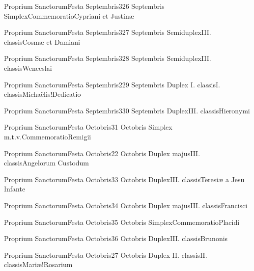 \documentclass[psalterium-feriale.tex]{subfiles}
\begin{document}
	{Proprium Sanctorum}{Festa Septembris}{3}{26 Septembris}
	{Simplex}{Commemoratio}{Cypriani et Justinæ}
	{}
	{}
\PMEXaRubric

	{Proprium Sanctorum}{Festa Septembris}{3}{27 Septembris}
	{Semiduplex}{III. classis}{Cosmæ et Damiani}
	{}
	{}
\PMEXaRubric

	{Proprium Sanctorum}{Festa Septembris}{3}{28 Septembris}
	{Semiduplex}{III. classis}{Wenceslai}
	{}
	{}
\UMEXaRubric

	{Proprium Sanctorum}{Festa Septembris}{2}{29 Septembris}
	{Duplex I. classis}{I. classis}{Michaëlis!Dedicatio}
	{}
	{}
\psalmodiapropria

	{Proprium Sanctorum}{Festa Septembris}{3}{30 Septembris}
	{Duplex}{III. classis}{Hieronymi}
	{}
	{}
\COPOcRubric

	{Proprium Sanctorum}{Festa Octobris}{3}{1 Octobris}
	{Simplex m.t.v.}{Commemoratio}{Remigii}
	{}
	{}
\COPOaRubric

	{Proprium Sanctorum}{Festa Octobris}{2}{2 Octobris}
	{Duplex majus}{III. classis}{Angelorum Custodum}
	{}
	{}
\psalmodiapropria

	{Proprium Sanctorum}{Festa Octobris}{3}{3 Octobris}
	{Duplex}{III. classis}{Teresiæ a Jesu Infante}
	{}
	{}
\MUVNcRubric

	{Proprium Sanctorum}{Festa Octobris}{3}{4 Octobris}
	{Duplex majus}{III. classis}{Francisci}
	{}
	{}
\COPOcRubric

	{Proprium Sanctorum}{Festa Octobris}{3}{5 Octobris}
	{Simplex}{Commemoratio}{Placidi}
	{}
	{}
\PMEXaRubric

	{Proprium Sanctorum}{Festa Octobris}{3}{6 Octobris}
	{Duplex}{III. classis}{Brunonis}
	{}
	{}
\COPOcRubric

	{Proprium Sanctorum}{Festa Octobris}{2}{7 Octobris}
	{Duplex II. classis}{II. classis}{Mariæ!Rosarium}
	{}
	{}
\psalmodiapropria
\end{document}

